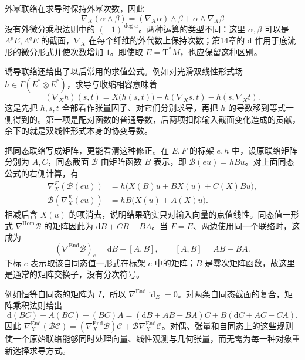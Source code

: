 外幂联络在求导时保持外幂次数，因此
\[
	\nabla_X(\alpha\wedge\beta)=(\nabla_X\alpha)\wedge\beta+\alpha\wedge\nabla_X\beta
\]
没有外微分乘积法则中的 \((-1)^{\deg\alpha}\)。两种运算的类型不同：这里 \(\alpha,\beta\) 可以是 \(\Lambda^pE,\Lambda^qE\) 的截面，\(\nabla_X\) 在每个纤维的外代数上保持次数；第14章的 \(\mathrm{d}\) 作用于底流形的微分形式并使次数增加 \(1\)。即使取 \(E=\mathrm{T}^*M\)，也应保留这种区别。

\ProseParagraphBreak

诱导联络还给出了以后常用的求值公式。例如对光滑双线性形式场 \(h\in\Gamma(E^*\otimes E^*)\)，求导与收缩相容意味着
\begin{equation}
	\label{g1:eq:connection-bilinear-form}
	(\nabla_Xh)(s,t)=X\bigl(h(s,t)\bigr)-h(\nabla_Xs,t)-h(s,\nabla_Xt).
\end{equation}
这是先把 \(h,s,t\) 全部看作张量因子、对它们分别求导，再把 \(h\) 的导数移到等式一侧得到的。第一项是配对函数的普通导数，后两项扣除输入截面变化造成的贡献，余下的就是双线性形式本身的协变导数。

\ProseParagraphBreak

把同态联络写成矩阵，更能看清这种修正。在 \(E,F\) 的标架 \(e,h\) 中，设原联络矩阵分别为 \(A,C\)，同态截面 \(\mathcal B\) 由矩阵函数 \(B\) 表示，即 \(\mathcal B(eu)=hBu\)。对上面同态公式的右侧计算，有
\begin{align*}
	\nabla^F_X(\mathcal B(eu))&=h\bigl(X(B)u+B X(u)+C(X)Bu\bigr),\\
	\mathcal B(\nabla^E_X(eu))&=hB\bigl(X(u)+A(X)u\bigr).
\end{align*}
相减后含 \(X(u)\) 的项消去，说明结果确实只对输入向量的点值线性。同态值一形式 \(\nabla^{\operatorname{Hom}}\mathcal B\) 的矩阵因此为 \(\mathrm{d}B+CB-BA\)。当 \(F=E\)、两边使用同一个联络时，这成为
\begin{equation}
	\label{g1:eq:endomorphism-connection}
	(\nabla^{\operatorname{End}}\mathcal B)_e
	=\mathrm{d}B+[A,B],\qquad [A,B]=AB-BA.
\end{equation}
下标 \(e\) 表示取该自同态值一形式在标架 \(e\) 中的矩阵；\(B\) 是零次矩阵函数，故这里是通常的矩阵交换子，没有分次符号。

\ProseParagraphBreak

例如恒等自同态的矩阵为 \(I\)，所以 \(\nabla^{\operatorname{End}}\operatorname{id}_E=0\)。对两条自同态截面的复合，矩阵乘积法则给出
\[
	\mathrm{d}(BC)+A(BC)-(BC)A
	=(\mathrm{d}B+AB-BA)C+B(\mathrm{d}C+AC-CA).
\]
因此 \(\nabla_X^{\operatorname{End}}(\mathcal B\mathcal C)=(\nabla_X^{\operatorname{End}}\mathcal B)\mathcal C+\mathcal B\nabla_X^{\operatorname{End}}\mathcal C\)。对偶、张量和自同态上的这些规则使一个原始联络能够同时处理向量、线性观测与几何张量，而无需为每一种对象重新选择求导方式。
